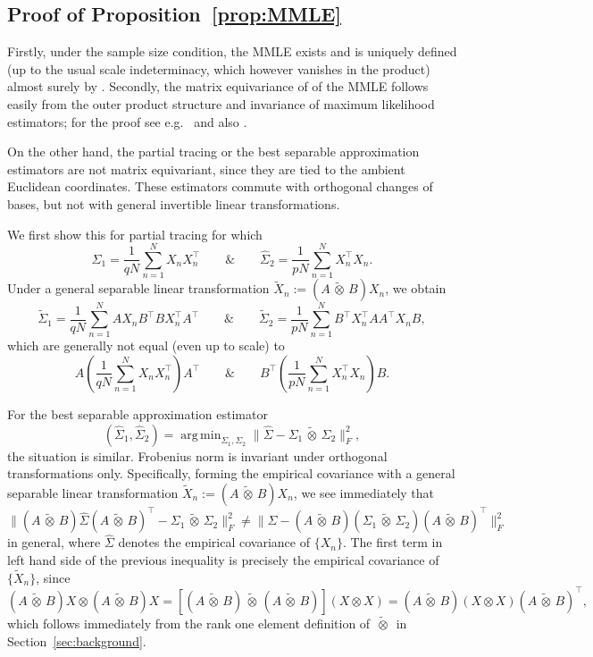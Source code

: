 \documentclass[12pt]{article}
\newcommand{\ot}{\,\tilde\otimes\,}
\DeclareMathOperator*{\argmin}{arg\,min}
\begin{document}
\subsection{Proof of Proposition~\ref{prop:MMLE}}

Firstly, under the sample size condition, the MMLE exists and is uniquely defined (up to the usual scale indeterminacy, which however vanishes in the product) almost surely by \citet{drton2021}. Secondly, the matrix equivariance of of the MMLE follows easily from the outer product structure and invariance of maximum likelihood estimators; for the proof see e.g.~\citet[choosing $h=n$ in Lemma 3.0.1]{MMCD} and also \citet{eaton1989group}.

On the other hand, the partial tracing or the best separable approximation estimators are not matrix equivariant, since they are tied to the ambient Euclidean coordinates. These estimators commute with orthogonal changes of bases, but not with general invertible linear transformations.

We first show this for partial tracing for which
\[
\widehat\Sigma_1 = \frac{1}{qN}\sum_{n=1}^N X_nX_n^\top \qquad\& \qquad \widehat\Sigma_2 = \frac{1}{pN}\sum_{n=1}^N X_n^\top X_n .
\]
Under a general separable linear transformation $\widetilde X_n := (A \ot B)X_n$, we obtain
\[
\widetilde\Sigma_1 = \frac{1}{qN}\sum_{n=1}^N AX_n B^\top BX_n^\top A^\top \qquad\& \qquad \widetilde\Sigma_2 = \frac{1}{pN}\sum_{n=1}^N B^\top X_n^\top A A^\top X_n B,
\]
which are generally not equal (even up to scale) to
\[
A\left(\frac{1}{qN}\sum_{n=1}^N X_n X_n^\top \right) A^\top \qquad\& \qquad B^\top\left(\frac{1}{pN}\sum_{n=1}^N  X_n^\top X_n \right) B.
\]

For the best separable approximation estimator
\[
(\widehat\Sigma_1,\widehat\Sigma_2) = \argmin_{\Sigma_1,\Sigma_2} \| \widehat{\Sigma} - \Sigma_1 \ot \Sigma_2 \|_F^2,
\]
the situation is similar. Frobenius norm is invariant under orthogonal transformations only. Specifically, forming the empirical covariance with a general separable linear transformation $\widetilde X_n := (A \ot B)X_n$, we see immediately that
\[
\| (A \ot B) \widehat{\Sigma} (A\ot B)^\top - \Sigma_1 \ot \Sigma_2 \|_F^2 \neq \| \widehat{\Sigma} - (A\ot B)(\Sigma_1 \ot \Sigma_2) (A \ot B)^\top \|_F^2
\]
in general, where $\widehat{\Sigma}$ denotes the empirical covariance of $\{X_n\}$. The first term in left hand side of the previous inequality is precisely the empirical covariance of $\{\widetilde X_n\}$, since
\[
(A\ot B) X \otimes (A\ot B) X = [(A\ot B) \ot (A\ot B)](X \otimes X) = (A\ot B) (X \otimes X) (A\ot B)^\top,
\]
which follows immediately from the rank one element definition of $\ot$ in Section~\ref{sec:background}.
\end{document}
